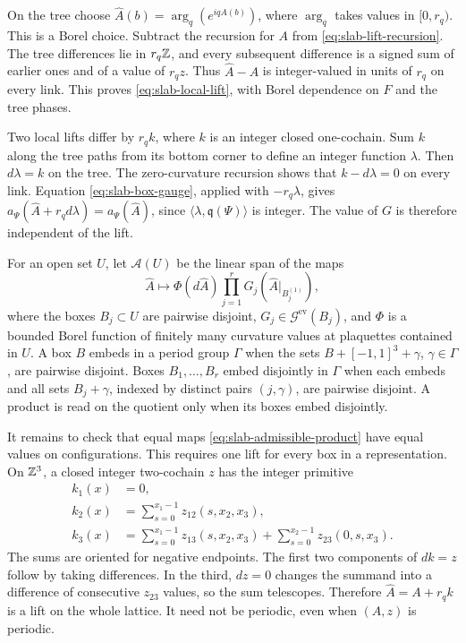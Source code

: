 On the tree choose $\widehat A(b)=\arg_q(e^{iqA(b)})$, where
$\arg_q$ takes values in $[0,r_q)$. This is a Borel choice. Subtract
the recursion for $A$ from \eqref{eq:slab-lift-recursion}. The tree
differences lie in $r_q\mathbb Z$, and every subsequent difference is a signed
sum of earlier ones and of a value of $r_qz$. Thus
$\widehat A-A$ is integer-valued in units of $r_q$ on every link. This
proves \eqref{eq:slab-local-lift}, with Borel dependence on $F$ and the
tree phases.

Two local lifts differ by $r_qk$, where $k$ is an integer closed
one-cochain. Sum $k$ along the tree paths from its bottom corner to
define an integer function $\lambda$. Then $d\lambda=k$ on the tree.
The zero-curvature recursion shows that $k-d\lambda=0$ on every link.
Equation \eqref{eq:slab-box-gauge}, applied with $-r_q\lambda$, gives
$a_\Psi(\widehat A+r_qd\lambda)=a_\Psi(\widehat A)$, since
$\langle\lambda,\mathfrak q(\Psi)\rangle$ is integer. The value of $G$
is therefore independent of the lift.

For an open set $U$, let $\mathcal A(U)$ be the linear span of the maps
\begin{equation}\label{eq:slab-admissible-product}
 \widehat A\longmapsto\Phi(d\widehat A)
                   \prod_{j=1}^rG_j(\widehat A|_{B_j^{(1)}}),
\end{equation}
where the boxes $B_j\subset U$ are pairwise disjoint,
$G_j\in\mathcal G^{\mathrm{ev}}(B_j)$, and $\Phi$ is a bounded Borel
function of finitely many curvature values at plaquettes contained in
$U$. A box $B$ embeds in a period group $\Gamma$ when the sets
$B+[-1,1]^3+\gamma$, $\gamma\in\Gamma$, are pairwise disjoint.
Boxes $B_1,\ldots,B_r$ embed disjointly in $\Gamma$ when each
embeds and all sets $B_j+\gamma$, indexed by distinct pairs
$(j,\gamma)$, are pairwise disjoint. A product is read on the
quotient only when its boxes embed disjointly.

It remains to check that equal maps \eqref{eq:slab-admissible-product}
have equal values on configurations. This requires one lift for every
box in a representation. On $\mathbb Z^3$, a closed integer two-cochain $z$
has the integer primitive
\begin{align*}
 k_1(x)&=0,\\
 k_2(x)&=\sum_{s=0}^{x_1-1}z_{12}(s,x_2,x_3),\\
 k_3(x)&=\sum_{s=0}^{x_1-1}z_{13}(s,x_2,x_3)
                    +\sum_{s=0}^{x_2-1}z_{23}(0,s,x_3).
\end{align*}
The sums are oriented for negative endpoints. The first two components
of $dk=z$ follow by taking differences. In the third, $dz=0$ changes
the summand into a difference of consecutive $z_{23}$ values, so the
sum telescopes. Therefore $\widehat A=A+r_qk$ is a lift on the whole
lattice. It need not be periodic, even when $(A,z)$ is periodic.

